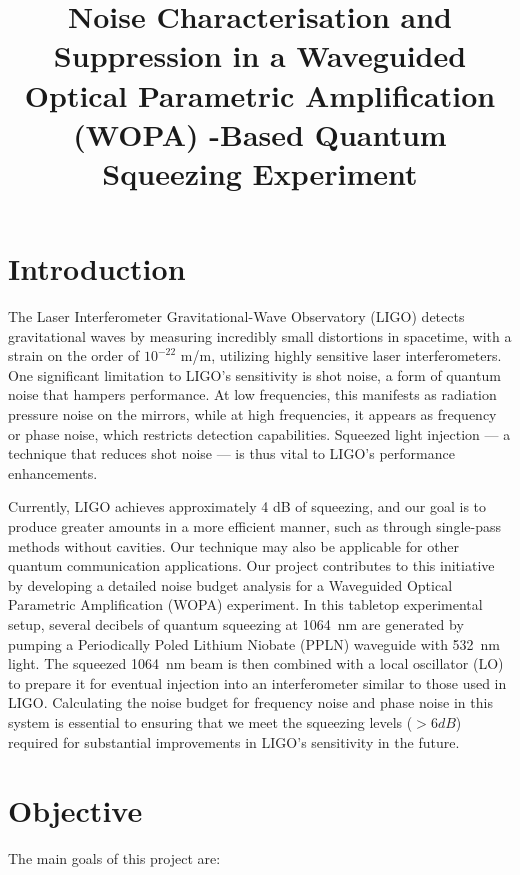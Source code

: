 \documentclass[colorlinks=true,pdfstartview=FitV,linkcolor=blue,
citecolor=red,urlcolor=magenta]{ligodoc}
\title{\large{ Noise Characterisation and Suppression in a Waveguided Optical Parametric Amplification (WOPA) -Based Quantum Squeezing Experiment}}
\author{}
\begin{document}
\tableofcontents

\newpage
\section{Introduction}
The Laser Interferometer Gravitational-Wave Observatory (LIGO) detects gravitational waves by measuring incredibly small distortions in spacetime, with a strain on the order of \(10^{-22}\) m/m, utilizing highly sensitive laser interferometers. One significant limitation to LIGO's sensitivity is shot noise, a form of quantum noise that hampers performance. At low frequencies, this manifests as radiation pressure noise on the mirrors, while at high frequencies, it appears as frequency or phase noise, which restricts detection capabilities. Squeezed light injection — a technique that reduces shot noise — is thus vital to LIGO's performance enhancements.

Currently, LIGO achieves approximately 4 dB of squeezing, and our goal is to produce greater amounts in a more efficient manner, such as through single-pass methods without cavities. Our technique may also be applicable for other quantum communication applications. Our project contributes to this initiative by developing a detailed noise budget analysis for a Waveguided Optical Parametric Amplification (WOPA) experiment. In this tabletop experimental setup, several decibels of quantum squeezing at \SI{1064}{\nano\meter} are generated by pumping a Periodically Poled Lithium Niobate (PPLN) waveguide with \SI{532}{\nano\meter} light. The squeezed \SI{1064}{\nano\meter} beam is then combined with a local oscillator (LO) to prepare it for eventual injection into an interferometer similar to those used in LIGO. Calculating the noise budget for frequency noise and phase noise in this system is essential to ensuring that we meet the squeezing levels ($> 6 dB$) required for substantial improvements in LIGO’s sensitivity in the future.

\section{Objective}
The main goals of this project are:
\end{document}
